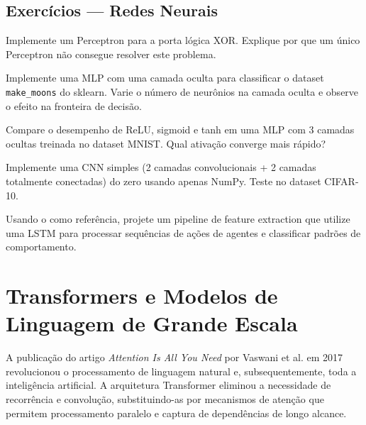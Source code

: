 \subsection{Exercícios — Redes Neurais}
\begin{exercicio}
Implemente um Perceptron para a porta lógica XOR. Explique por que um único
Perceptron não consegue resolver este problema.
\end{exercicio}
\begin{exercicio}
Implemente uma MLP com uma camada oculta para classificar o dataset
\texttt{make\_moons} do sklearn. Varie o número de neurônios na camada oculta
e observe o efeito na fronteira de decisão.
\end{exercicio}
\begin{exercicio}
Compare o desempenho de ReLU, sigmoid e tanh em uma MLP com 3 camadas
ocultas treinada no dataset MNIST. Qual ativação converge mais rápido?
\end{exercicio}
\begin{exercicio}
Implemente uma CNN simples (2 camadas convolucionais + 2 camadas totalmente
conectadas) do zero usando apenas NumPy. Teste no dataset CIFAR-10.
\end{exercicio}
\begin{exercicio}
Usando o \opencodeeco{} como referência, projete um pipeline de feature
extraction que utilize uma LSTM para processar sequências de ações de agentes
e classificar padrões de comportamento.
\end{exercicio}
\section{Transformers e Modelos de Linguagem de Grande Escala}
\label{sec:transformers-llms}
\nivelavancado
A publicação do artigo \textit{Attention Is All You Need} por Vaswani et
al. \cite{vaswani2017attention} em 2017 revolucionou o processamento de
linguagem natural e, subsequentemente, toda a inteligência artificial.
A arquitetura Transformer eliminou a necessidade de recorrência e convolução,
substituindo-as por mecanismos de atenção que permitem processamento
paralelo e captura de dependências de longo alcance.
